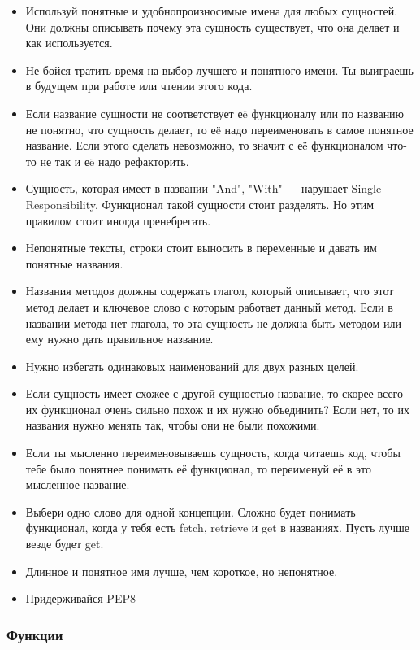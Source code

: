 \begin{itemize}
	\item Используй понятные и удобнопроизносимые имена для любых сущностей. Они должны описывать почему эта сущность существует, что она делает и как используется.
	\item Не бойся тратить время на выбор лучшего и понятного имени. Ты выиграешь в будущем при работе или чтении этого кода.
	\item Если название сущности не соответствует еë функционалу или по названию не понятно, что сущность делает, то еë надо переименовать в самое понятное название. Если этого сделать невозможно, то значит с еë функционалом что-то не так и еë надо рефакторить.
	\item Сущность, которая имеет в названии "And", "With" — нарушает Single Responsibility. Функционал такой сущности стоит разделять. Но этим правилом стоит иногда пренебрегать.
	\item Непонятные тексты, строки стоит выносить в переменные и давать им понятные названия.
	\item Названия методов должны содержать глагол, который описывает, что этот метод делает и ключевое слово с которым работает данный метод. Если в названии метода нет глагола, то эта сущность не должна быть методом или ему нужно дать правильное название.
	\item Нужно избегать одинаковых наименований для двух разных целей.
	\item Если сущность имеет схожее с другой сущностью название, то скорее всего их функционал очень сильно похож и их нужно объединить? Если нет, то их названия нужно менять так, чтобы они не были похожими.
	\item Если ты мысленно переименовываешь сущность, когда читаешь код, чтобы тебе было понятнее понимать её функционал, то переименуй её в это мысленное название.
	\item Выбери одно слово для одной концепции. Сложно будет понимать функционал, когда у тебя есть fetch, retrieve и get в названиях. Пусть лучше везде будет get.
	\item Длинное и понятное имя лучше, чем короткое, но непонятное.
	\item Придерживайся PEP8
\end{itemize}

\subsubsection{Функции}

